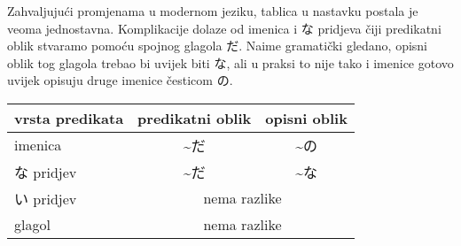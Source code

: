 	
	Zahvaljujući promjenama u modernom jeziku, tablica u nastavku postala je veoma jednostavna. Komplikacije dolaze od imenica i な pridjeva čiji predikatni oblik stvaramo pomoću spojnog glagola だ. Naime gramatički gledano, opisni oblik tog glagola trebao bi uvijek biti な, ali u praksi to nije tako i imenice gotovo uvijek opisuju druge imenice česticom の\footnotemark[4].
	
	
	\begin{table}[h]
		\centering
		\begin{tabular}{l c c}\toprule[2pt]
			vrsta predikata & predikatni oblik & opisni oblik\\
			\midrule
			imenica & \textasciitilde だ & \textasciitilde の\\
			な pridjev & \textasciitilde だ & \textasciitilde な\\
			い pridjev & \multicolumn{2}{c}{nema razlike}\\
			glagol & \multicolumn{2}{c}{nema razlike}\\
			\bottomrule[2pt]
		\end{tabular}
	\end{table}


